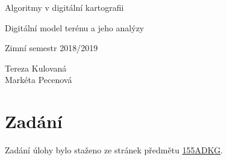 \documentclass[a4paper, 12pt]{article}
\begin{document}
\begin{titlepage}
\begin{center}
\Huge
\vspace*{4.5cm}
Algoritmy v digitální kartografii\\
\vspace{0.2cm}

\Large  
Digitální model terénu a jeho analýzy\\
\vspace{0.2cm}

\normalsize  
Zimní semestr 2018/2019\\
\vspace{14cm}
\end{center}

\begin{flushright}
\Large
Tereza Kulovaná \\
Markéta Pecenová \\
\end{flushright}

\end{titlepage}


\pagestyle{plain}     %
\setcounter{page}{1}  %

\tableofcontents
\newpage

\section{Zadání}
Zadání úlohy bylo staženo ze stránek předmětu \href{https://web.natur.cuni.cz/~bayertom/index.php/teaching/algoritmy-v-digitalni-kartografii}{155ADKG}.
\end{document}
